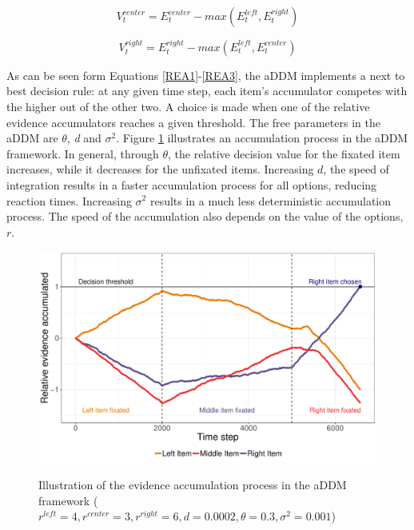 \documentclass[11pt,a4paper]{article}
\begin{document}
\begin{equation} \label{REA2}
V_{t}^{center}=E_{t}^{center}-max(E_{t}^{left},E_{t}^{right})
\end{equation}


\begin{equation} \label{REA3}
V_{t}^{right}=E_{t}^{right}-max(E_{t}^{left},E_{t}^{center})
\end{equation}

As can be seen form Equations \ref{REA1}-\ref{REA3}, the aDDM implements a next to best decision rule: at any given time step, each item's accumulator competes with the higher out of the other two. A choice is made when one of the relative evidence accumulators reaches a given threshold. The free parameters in the aDDM are $\theta$, \textit{d} and $\sigma^{2}$. Figure \ref{fig:driftrates} illustrates an accumulation process in the aDDM framework. In general, through $\theta$, the relative decision value for the fixated item increases, while it decreases for the unfixated items. Increasing $d$, the speed of integration results in a faster accumulation process for all options, reducing reaction times. Increasing $\sigma^{2}$ results in a much less deterministic accumulation process. The speed of the accumulation also depends on the value of the options, $r$. 

\begin{figure}
\captionsetup{justification=centering}
\caption{Illustration of the evidence accumulation process in the aDDM framework
($\mathit{\mathit{r^{left}=4, r^{center}=3, r^{right}=6, d=0.0002}, \theta=0.3, \sigma^{2}=0.001}$)}
\includegraphics[width=1\textwidth]{c1_driftrates.pdf}
\label{fig:driftrates}
\end{figure}
\end{document}
